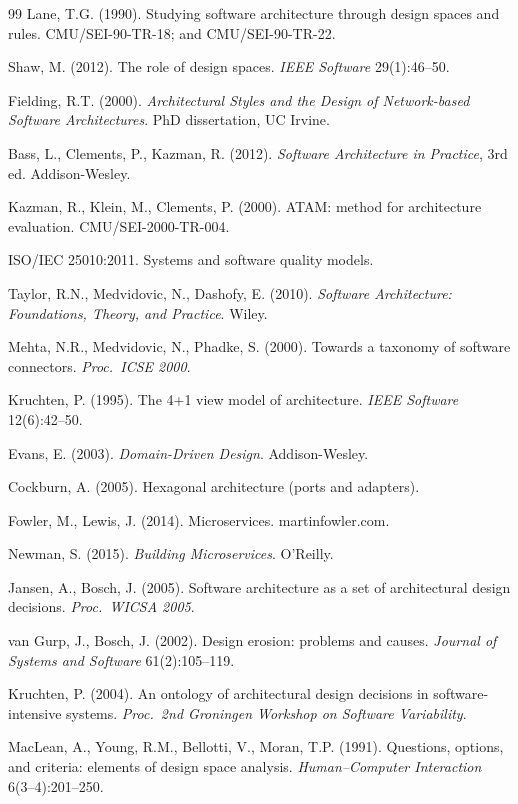 \documentclass[11pt,oneside]{article}
\theoremstyle{definition}
\begin{document}
\begin{thebibliography}{99}
 Lane, T.G. (1990). Studying software architecture through design spaces and
rules. CMU/SEI-90-TR-18; and CMU/SEI-90-TR-22.

 Shaw, M. (2012). The role of design spaces. \emph{IEEE Software} 29(1):46--50.

 Fielding, R.T. (2000). \emph{Architectural Styles and the Design of
Network-based Software Architectures}. PhD dissertation, UC Irvine.

 Bass, L., Clements, P., Kazman, R. (2012). \emph{Software Architecture in
Practice}, 3rd ed. Addison-Wesley.

 Kazman, R., Klein, M., Clements, P. (2000). ATAM: method for architecture
evaluation. CMU/SEI-2000-TR-004.

 ISO/IEC 25010:2011. Systems and software quality models.

 Taylor, R.N., Medvidovic, N., Dashofy, E. (2010). \emph{Software
Architecture: Foundations, Theory, and Practice}. Wiley.

 Mehta, N.R., Medvidovic, N., Phadke, S. (2000). Towards a taxonomy of
software connectors. \emph{Proc.\ ICSE 2000}.

 Kruchten, P. (1995). The 4+1 view model of architecture. \emph{IEEE
Software} 12(6):42--50.

 Evans, E. (2003). \emph{Domain-Driven Design}. Addison-Wesley.

 Cockburn, A. (2005). Hexagonal architecture (ports and adapters).

 Fowler, M., Lewis, J. (2014). Microservices. martinfowler.com.

 Newman, S. (2015). \emph{Building Microservices}. O'Reilly.

 Jansen, A., Bosch, J. (2005). Software architecture as a set of
architectural design decisions. \emph{Proc.\ WICSA 2005}.

 van Gurp, J., Bosch, J. (2002). Design erosion: problems and causes.
\emph{Journal of Systems and Software} 61(2):105--119.

 Kruchten, P. (2004). An ontology of architectural design decisions in
software-intensive systems. \emph{Proc.\ 2nd Groningen Workshop on Software Variability}.

 MacLean, A., Young, R.M., Bellotti, V., Moran, T.P. (1991). Questions,
options, and criteria: elements of design space analysis. \emph{Human--Computer Interaction}
6(3--4):201--250.


\end{thebibliography}
\end{document}
